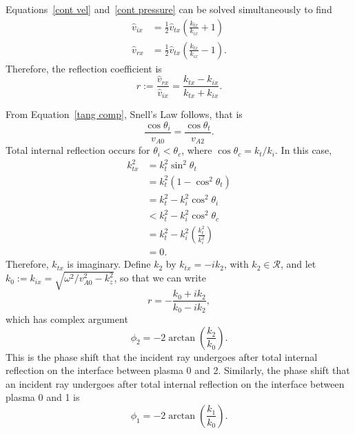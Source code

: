 \documentclass[12pt]{article}
\begin{document}
	Equations~\eqref{cont vel} and~\eqref{cont pressure} can be solved simultaneously to find
	\begin{align}
	\hat{v}_{ix} &= \frac{1}{2}\hat{v}_{tx}\left(\frac{k_{tx}}{k_{ix}} + 1\right) \\
	\hat{v}_{rx} &= \frac{1}{2}\hat{v}_{tx}\left(\frac{k_{tx}}{k_{ix}} - 1\right).
	\end{align}
	Therefore, the reflection coefficient  is
	\begin{equation}
	r := \frac{\hat{v}_{rx}}{\hat{v}_{ix}} = \frac{k_{tx} - k_{ix}}{k_{tx} + k_{ix}}.
	\end{equation}
	
	From Equation~\eqref{tang comp}, Snell's Law follows, that is
	\begin{equation}
	\frac{\cos{\theta_i}}{v_{A0}} = \frac{\cos{\theta_t}}{v_{A2}}.
	\end{equation}
	Total internal reflection occurs for $\theta_i < \theta_c$, where $\cos{\theta_c} = k_t / k_i$. In this case,
	\begin{align}
	k_{tx}^2 &= k_t^2 \sin^2{\theta_t} \\
	&= k_t^2(1 - \cos^2{\theta_t}) \\
	&= k_t^2 - k_i^2\cos^2{\theta_i} \\
	&< k_t^2 - k_i^2\cos^2{\theta_c} \\
	&= k_t^2 - k_i^2 \left(\frac{k_t^2}{k_i^2}\right) \\
	&= 0.
	\end{align}
	Therefore, $k_{tx}$ is imaginary. Define $k_2$ by $k_{tx} = -i k_2$, with $k_2 \in \mathcal{R}$, and let $k_0 := k_{ix} = \sqrt{\omega^2/v_{A0}^2 - k_z^2}$, so that we can write
	\begin{equation}
	r = -\frac{k_0 + ik_2}{k_0 - ik_2},
	\end{equation}
	which has complex argument
	\begin{equation}
	\phi_2 = -2 \arctan\left(\frac{k_2}{k_0}\right).
	\end{equation}
	This is the phase shift that the incident ray undergoes after total internal reflection on the interface between plasma 0 and 2. Similarly, the phase shift that an incident ray undergoes after total internal reflection on the interface between plasma 0 and 1 is
	\begin{equation}
	\phi_1 = -2 \arctan\left(\frac{k_1}{k_0}\right).
	\end{equation}
	
\end{document}
